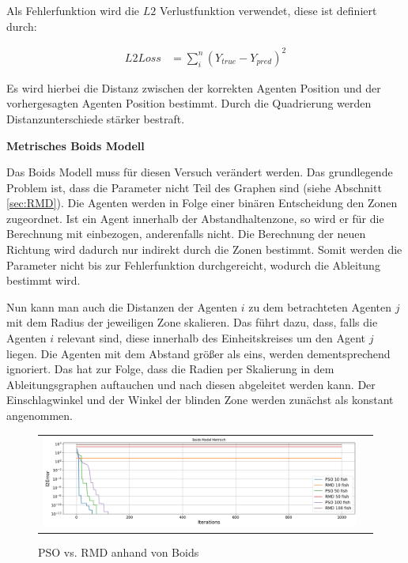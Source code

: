 Als Fehlerfunktion wird die $L2$ Verlustfunktion verwendet, diese ist definiert durch:


\begin{subequations}
\begin{align*}
L2Loss &= \sum_i^n(Y_{true} - Y_{pred})^2
\end{align*}
\end{subequations}

Es wird hierbei die Distanz zwischen der korrekten Agenten Position und der vorhergesagten Agenten Position bestimmt.
Durch die Quadrierung werden Distanzunterschiede stärker bestraft.

\textbf{Metrisches Boids Modell}

Das Boids Modell muss für diesen Versuch verändert werden. Das grundlegende Problem ist, dass die Parameter nicht Teil des Graphen sind (siehe Abschnitt \ref{sec:RMD}). Die Agenten werden in Folge einer binären Entscheidung den Zonen zugeordnet. Ist ein Agent innerhalb der Abstandhaltenzone, so wird er für die Berechnung mit einbezogen, anderenfalls nicht. Die Berechnung der neuen Richtung wird dadurch nur indirekt durch die Zonen bestimmt. Somit werden die Parameter nicht bis zur Fehlerfunktion durchgereicht, wodurch die Ableitung bestimmt wird.

Nun kann man auch die Distanzen der Agenten $i$ zu dem betrachteten Agenten $j$ mit dem Radius der jeweiligen Zone skalieren.
Das führt dazu, dass, falls die Agenten $i$ relevant sind, diese innerhalb des Einheitskreises um den Agent $j$ liegen. Die Agenten mit dem Abstand größer als eins, werden dementsprechend ignoriert. Das hat zur Folge, dass die Radien per Skalierung in dem Ableitungsgraphen auftauchen und nach diesen abgeleitet werden kann. Der Einschlagwinkel und der Winkel der blinden Zone werden zunächst als konstant angenommen.

\begin{figure}[h]
\centering
\begin{tabular}{cc}
\includegraphics[width=1.0\textwidth]{figures/Experimente/Boids_Laufzeit.png} 

\end{tabular}
\caption{PSO vs. RMD anhand von Boids \label{fig:BOIDS_PSOVSRMD} }
\end{figure}

